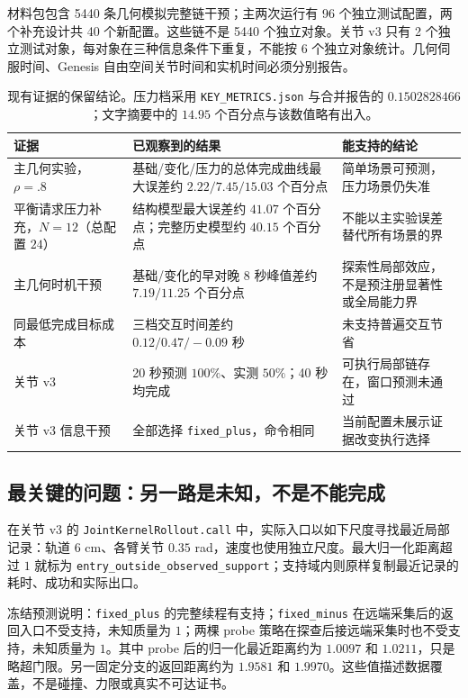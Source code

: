 \documentclass[11pt,a4paper,fontset=fandol]{ctexart}
\theoremstyle{definition}
\theoremstyle{remark}\newtheorem{remark}[theorem]{说明}
\numberwithin{equation}{section}
\begin{document}
材料包包含 5440 条几何模拟完整链干预；主两次运行有 96 个独立测试配置，两个补充设计共 40 个新配置。这些链不是 5440 个独立对象。关节 v3 只有 2 个独立测试对象，每对象在三种信息条件下重复，不能按 6 个独立对象统计。几何伺服时间、Genesis 自由空间关节时间和实机时间必须分别报告。

\begin{table}[htbp]\centering\small
\begin{tabularx}{\linewidth}{P{.24\linewidth}YY}\toprule
证据 & 已观察到的结果 & 能支持的结论\\\midrule
主几何实验，$\rho=.8$ & 基础/变化/压力的总体完成曲线最大误差约 $2.22/7.45/15.03$ 个百分点 & 简单场景可预测，压力场景仍失准\\
平衡请求压力补充，$N=12$（总配置 $24$） & 结构模型最大误差约 $41.07$ 个百分点；完整历史模型约 $40.15$ 个百分点 & 不能以主实验误差替代所有场景的界\\
主几何时机干预 & 基础/变化的早对晚 8 秒峰值差约 $7.19/11.25$ 个百分点 & 探索性局部效应，不是预注册显著性或全局能力界\\
同最低完成目标成本 & 三档交互时间差约 $0.12/0.47/-0.09$ 秒 & 未支持普遍交互节省\\
关节 v3 & 20 秒预测 $100\%$、实测 $50\%$；40 秒均完成 & 可执行局部链存在，窗口预测未通过\\
关节 v3 信息干预 & 全部选择 \texttt{fixed\_plus}，命令相同 & 当前配置未展示证据改变执行选择\\\bottomrule
\end{tabularx}
\caption{现有证据的保留结论。压力档采用 \texttt{KEY\_METRICS.json} 与合并报告的 $0.1502828466$；文字摘要中的 $14.95$ 个百分点与该数值略有出入。}
\label{tab:evidence}
\end{table}

\subsection{最关键的问题：另一路是未知，不是不能完成}
在关节 v3 的 \texttt{JointKernelRollout.call} 中，实际入口以如下尺度寻找最近局部记录：轨道 $6$ cm、各臂关节 $0.35$ rad，速度也使用独立尺度。最大归一化距离超过 $1$ 就标为 \texttt{entry\_outside\_observed\_support}；支持域内则原样复制最近记录的耗时、成功和实际出口\cite{jointcode}。

冻结预测说明：\texttt{fixed\_plus} 的完整续程有支持；\texttt{fixed\_minus} 在远端采集后的返回入口不受支持，未知质量为 $1$；两棵 probe 策略在探查后接远端采集时也不受支持，未知质量为 $1$。其中 probe 后的归一化最近距离约为 $1.0097$ 和 $1.0211$，只是略超门限。另一固定分支的返回距离约为 $1.9581$ 和 $1.9970$。这些值描述数据覆盖，不是碰撞、力限或真实不可达证书。
\end{document}
